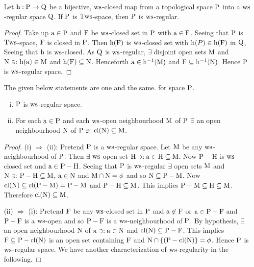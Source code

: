\begin{thm}\label{thm8.3.6}
Let $\mathrm{h}: \mathrm{P} \to \mathrm{Q}$ be a bijective, $\mathrm{ws}$-closed map from a topological space $\mathrm{P}$ into a $\mathrm{ws}$-regular space $\mathrm{Q}$. If $\mathrm{P}$ is $\mathrm{T}\mathrm{ws}$-space, then $\mathrm{P}$ is $\mathrm{ws}$-regular.
\end{thm}

\begin{proof}
Take up $\mathrm{a} \in \mathrm{P}$ and $\mathrm{F}$ be $\mathrm{ws}$-closed set in $\mathrm{P}$ with $\mathrm{a} \in \mathrm{F}$. Seeing that $\mathrm{P}$ is $\mathrm{T}\mathrm{ws}$-space, $\mathrm{F}$ is closed in $\mathrm{P}$. Then $\mathrm{h}(\mathrm{F})$ is $\mathrm{ws}$-closed set with $\mathrm{h}(P) \in \mathrm{h}(\mathrm{F})$ in $\mathrm{Q}$, Seeing that $\mathrm{h}$ is $\mathrm{ws}$-closed. As $\mathrm{Q}$ is $\mathrm{ws}$-regular, $\exists$ disjoint open sets $\mathrm{M}$ and $\mathrm{N} \ni: \mathrm{h}(\mathrm{a}) \in \mathrm{M}$ and $\mathrm{h}(\mathrm{F}) \subseteq \mathrm{N}$. Henceforth $\mathrm{a} \in \mathrm{h}^{-1}(\mathrm{M})$ and $\mathrm{F} \subseteq \mathrm{h}^{-1} (\mathrm{N})$. Hence $\mathrm{P}$ is $\mathrm{ws}$-regular space.
\end{proof}

\begin{thm}\label{thm8.3.7}
The given below statements are one and the same. for space $\mathrm{P}$.
\begin{enumerate}[(i)]
\item $\mathrm{P}$ is $\mathrm{ws}$-regular space.
\item For each $\mathrm{a} \in \mathrm{P}$ and each $\mathrm{ws}$-open neighbourhood $\mathrm{M}$ of $\mathrm{P}$ $\exists$ an open neighbourhood $\mathrm{N}$ of $\mathrm{P}\ni: \mathrm{cl} (\mathrm{N}) \subseteq \mathrm{M}$.
\end{enumerate}
\end{thm}

\begin{proof}
(i) $\Rightarrow$ (ii): Pretend $\mathrm{P}$ is a $\mathrm{ws}$-regular space. Let $\mathrm{M}$ be any $\mathrm{ws}$-neighbourhood of $\mathrm{P}$. Then $\exists$ $\mathrm{ws}$-open set $\mathrm{H} \ni: \mathrm{a} \in \mathrm{H} \subseteq \mathrm{M}$. Now $\mathrm{P}-\mathrm{H}$ is $\mathrm{ws}$-closed set and $\mathrm{a} \in\mathrm{P} - \mathrm{H}$. Seeing that $\mathrm{P}$ is $\mathrm{ws}$-regular $\exists$ open sets $\mathrm{M}$ and $\mathrm{N} \ni: \mathrm{P} - \mathrm{H} \subseteq \mathrm{M}$, $\mathrm{a}\in \mathrm{N}$ and $\mathrm{M}\cap \mathrm{N} = \phi$ and so $\mathrm{N} \subseteq \mathrm{P} -\mathrm{M}$. Now $\mathrm{cl}(\mathrm{N}) \subseteq \mathrm{cl}(\mathrm{P} - \mathrm{M}) = \mathrm{P} -\mathrm{M}$ and $\mathrm{P} - \mathrm{H} \subseteq \mathrm{M}$. This implies $\mathrm{P} - \mathrm{M} \subseteq \mathrm{H} \subseteq \mathrm{M}$. Therefore $\mathrm{cl}(\mathrm{N}) \subseteq \mathrm{M}$.

(ii) $\Rightarrow$ (i): Pretend $\mathrm{F}$ be any $\mathrm{ws}$-closed set in $\mathrm{P}$ and $\mathrm{a} \not\in \mathrm{F}$ or $\mathrm{a} \in \mathrm{P} -\mathrm{F}$ and $\mathrm{P} -\mathrm{F}$ is a $\mathrm{ws}$-open and so $\mathrm{P} -\mathrm{F}$ is a $\mathrm{ws}$-neighbourhood of $\mathrm{P}$. By hypothesis, $\exists$ an open neighbourhood $\mathrm{N}$ of $\mathrm{a} \ni: \mathrm{a} \in \mathrm{N}$ and $\mathrm{cl}(\mathrm{N}) \subseteq \mathrm{P} -\mathrm{F}$. This implies $\mathrm{F} \subseteq \mathrm{P} -\mathrm{cl}(\mathrm{N})$ is an open set containing $\mathrm{F}$ and $\mathrm{N} \cap \{(\mathrm{P} - \mathrm{cl}(\mathrm{N})\} = \phi$. Hence $\mathrm{P}$ is $\mathrm{ws}$-regular space. We have another characterization of $\mathrm{ws}$-regularity in the following.
\end{proof}

